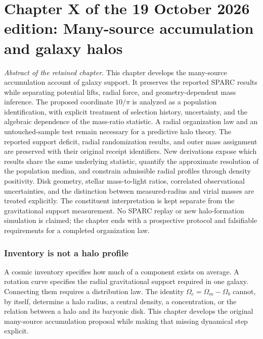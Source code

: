 \begin{abstract}
This supplement retains, unchanged in text and in their original section numbering, the parts of the 19 October 2026 edition of Volume I that the 25 October 2026 edition retires from the body of the volume on Sean Brady's decision: the whole of Chapter X on many-source accumulation and galaxy halos. Chapter XII Sections 6 and 9--19, retired with it under Option A, returned to the body of the volume later the same day on Sean Brady's decision: Section 6 to Chapter XII, Sections 9--19 as the new Chapter XIII.
\end{abstract}

\part*{Chapter X of the 19 October 2026 edition: Many-source accumulation and galaxy halos}
\noindent\textit{Abstract of the retained chapter.} This chapter develops the many-source accumulation account of galaxy support. It preserves the reported SPARC results while separating potential lifts, radial force, and geometry-dependent mass inference. The proposed coordinate $10/\pi$ is analyzed as a population identification, with explicit treatment of selection history, uncertainty, and the algebraic dependence of the mass-ratio statistic. A radial organization law and an untouched-sample test remain necessary for a predictive halo theory. The reported support deficit, radial randomization results, and outer mass assignment are preserved with their original receipt identifiers. New derivations expose which results share the same underlying statistic, quantify the approximate resolution of the population median, and constrain admissible radial profiles through density positivity. Disk geometry, stellar mass-to-light ratios, correlated observational uncertainties, and the distinction between measured-radius and virial masses are treated explicitly. The constituent interpretation is kept separate from the gravitational support measurement. No SPARC replay or new halo-formation simulation is claimed; the chapter ends with a prospective protocol and falsifiable requirements for a completed organization law.

\section{Inventory is not a halo profile}

A cosmic inventory specifies how much of a component exists on average. A rotation curve specifies the radial gravitational support required in one galaxy. Connecting them requires a distribution law. The identity $\Omega_c=\Omega_m-\Omega_b$ cannot, by itself, determine a halo radius, a central density, a concentration, or the relation between a halo and its baryonic disk. This chapter develops the original many-source accumulation proposal while making that missing dynamical step explicit.

